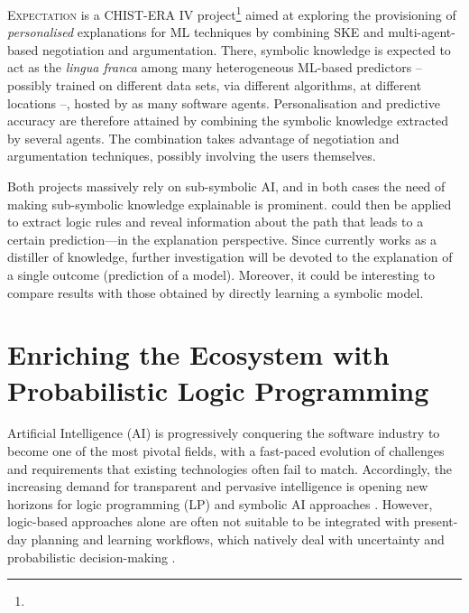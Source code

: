 \documentclass[12pt,a4paper,openright,twoside]{book}
\begin{document}
\textsc{Expectation} is a CHIST-ERA IV project\footnote{} aimed at exploring the provisioning of \emph{personalised} explanations for ML techniques by combining SKE and multi-agent-based negotiation and argumentation.
%
There, symbolic knowledge is expected to act as the \emph{lingua franca} among many heterogeneous ML-based predictors -- possibly trained on different data sets, via different algorithms, at different locations --, hosted by as many software agents.
%
Personalisation and predictive accuracy are therefore attained by combining the symbolic knowledge extracted by several agents.
%
The combination takes advantage of negotiation and argumentation techniques, possibly involving the users themselves.

Both projects massively rely on sub-symbolic AI, and in both cases the need of making sub-symbolic knowledge explainable is prominent.
%
\psyke{} could then be applied to extract logic rules and reveal information about the path that leads to a certain prediction---in the explanation perspective.
%
Since \psyke{} currently works as a distiller of knowledge, further investigation will be devoted to the explanation of a single outcome (prediction of a model).
%
Moreover, it could be interesting to compare results with those obtained by directly learning a symbolic model.

\chapter[Enriching the Ecosystem with PLP]{Enriching the Ecosystem with Probabilistic Logic Programming}


Artificial Intelligence (AI) is progressively conquering the software industry to become one of the most pivotal fields, with a fast-paced evolution of challenges and requirements that existing technologies often fail to match.
%
Accordingly, the increasing demand for transparent and pervasive intelligence is opening new horizons for logic programming (LP) and symbolic AI approaches \cite{lptech4mas-jaamas35,xaiethics-aiia2020,ortega2021symbolic}.
%
However, logic-based approaches alone are often not suitable to be integrated with present-day planning and learning workflows, which natively deal with uncertainty and probabilistic decision-making \cite{logictech-information11,xaisurvey-ia14}.
\end{document}

